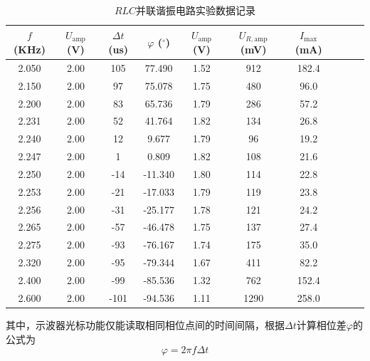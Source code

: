 \documentclass[UTF8]{article}
\theoremstyle{MyLineTheoremStyle} %
\theoremstyle{MyBlockTheoremStyle} %
\theoremstyle{MySubsubsectionStyle} %
\begin{document}
\begin{table}[H]\centering
    \caption{$ RLC $并联谐振电路实验数据记录}
    \label{RLC 并联谐振电路实验数据记录}
\begin{tabular}{cccccccccc}\toprule
    $f$ (KHz) & $U_{\text{amp}}$ (V) & $\Delta t$ (us) & $\varphi$ ($^\circ$) & $U_{ \text{amp}}$ (V)  & $U_{R, \text{amp}}$ (mV) & $I_{\max}$ (mA)  \\
    \midrule
    2.050	&2.00	&105	&77.490	    &1.52	&912	    &182.4  \\
    2.150	&2.00	&97	    &75.078	    &1.75	&480	    &96.0   \\
    2.200	&2.00	&83	    &65.736	    &1.79	&286	    &57.2   \\
    2.231	&2.00	&52	    &41.764	    &1.82	&134	    &26.8   \\
    2.240	&2.00	&12	    &9.677	    &1.79	&96	        &19.2   \\
    2.247	&2.00	&1	    &0.809	    &1.82	&108	    &21.6   \\
    2.250	&2.00	&-14	&-11.340	&1.80	&114	    &22.8   \\
    2.253	&2.00	&-21	&-17.033	&1.79	&119	    &23.8   \\
    2.256	&2.00	&-31	&-25.177	&1.78	&121	    &24.2   \\
    2.265	&2.00	&-57	&-46.478	&1.75	&137	    &27.4   \\
    2.275	&2.00	&-93	&-76.167	&1.74	&175	    &35.0   \\
    2.320	&2.00	&-95	&-79.344	&1.67	&411	    &82.2   \\
    2.400	&2.00	&-99	&-85.536	&1.32	&762	    &152.4  \\
    2.600	&2.00   &-101   &-94.536	&1.11	&1290	    &258.0  \\
    \bottomrule 
\end{tabular}
\end{table}

其中，示波器光标功能仅能读取相同相位点间的时间间隔，根据$ \Delta t $计算相位差$ \varphi $的公式为
\begin{equation}
\varphi=2\pi f\Delta t
\end{equation} 
\end{document}
